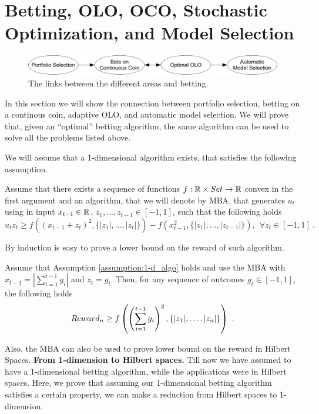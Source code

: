 \section{Betting, OLO, OCO, Stochastic Optimization, and Model Selection}
\label{sec:appl}

\begin{figure}[t]
\centering
\includegraphics[width=.95\linewidth]{./figs/links_between_areas.pdf}
\caption{The links between the different areas and betting.}
\end{figure}

In this section we will show the connection between portfolio selection, betting on a continous coin, adaptive OLO, and automatic model selection. We will prove that, given an ``optimal'' betting algorithm, the same algorithm can be used to solve all the problems listed above.

We will assume that a 1-dimensional algorithm exists, that satisfies the following assumption.
\begin{assumption}
\label{assumption:1-d_algo}
Assume that there exists a sequence of functions $f:\mathbb{R} \times Set \rightarrow \mathbb{R}$ convex in the first argument and an algorithm, that we will denote by \ac{MBA}, that generates $u_t$ using in input $x_{t-1} \in \mathbb{R}$, $z_1, \ldots, z_{t-1} \in [-1,1]$, such that the following holds
\begin{equation}
\label{eq:1_d_hp}
u_t z_t \geq f\left( (x_{t-1}+z_t)^2, \{|z_1|, \ldots, |z_t|\}\right)-f\left( x_{t-1}^2, \{|z_1|, \ldots, |z_{t-1}|\} \right), \ \ \forall z_{t} \in [-1,1]~.
\end{equation}
\end{assumption}

By induction is easy to prove a lower bound on the reward of such algorithm.
\begin{theorem}
\label{theo:1-d_reward}
Assume that Assumption \ref{assumption:1-d_algo} holds and use the \ac{MBA} with $x_{t-1}=|\sum_{i=1}^{t-1} g_i|$ and $z_t=g_t$.
Then, for any sequence of outcomes $g_t \in [-1,1]$, the following holds
\[
Reward_n \geq f\left( \left(\sum_{i=1}^{t-1} g_i \right)^2, \left\{|z_1|, \ldots, |z_n|\right\}\right)~.
\]
\end{theorem}

Also, the \ac{MBA} can also be used to prove lower bound on the reward in Hilbert Spaces.
\textbf{From 1-dimension to Hilbert spaces.}
Till now we have assumed to have a 1-dimensional betting algorithm, while the applications were in Hilbert spaces. Here, we prove that assuming our 1-dimensional betting algorithm satisfies a certain property, we can make a reduction from Hilbert spaces to 1-dimension.

